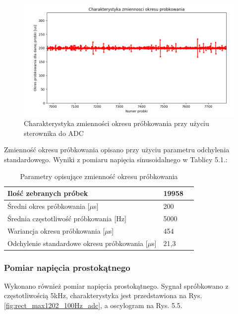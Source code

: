 \begin{figure}[h]
	\centering
		\includegraphics[width=14cm]{zmiennosc_probkowania_max1202}
	\caption{Charakterystyka zmienności okresu próbkowania przy użyciu sterownika do ADC} 
	\label{fig:zmiennosc_probkowania_max1202}
\end{figure}

Zmienność okresu próbkowania opisano przy użyciu parametru odchylenia standardowego. Wyniki z pomiaru napięcia sinusoidalnego w Tablicy 5.1.:

\begin{table}[t]
\label{tab5.1}
\centering
\begin{tabular}{|l|l|l|}
  \hline 
  Ilość zebranych próbek & 19958 \\
  \hline
  Średni okres próbkowania [$\mu$s] & 200 \\
  \hline
  Średnia częstotliwość próbkowania [Hz]& 5000 \\
  \hline 
  Wariancja okresu próbkowania [$\mu$s]  & 454 \\
  \hline
  Odchylenie standardowe okresu próbkowania [$\mu$s] & 21,3 \\
  \hline

  
\end{tabular}
\caption{Parametry opisujące zmienność okresu próbkowania} 
\end{table}


\subsubsection{Pomiar napięcia prostokątnego}

Wykonano również pomiar napięcia prostokątnego. Sygnał spróbkowano z częstotliwością 5kHz, charakterystyka jest przedstawiona na Rys. \ref{fig:rect_max1202_100Hz_adc}, a oscylogram na Rys. 5.5. 

